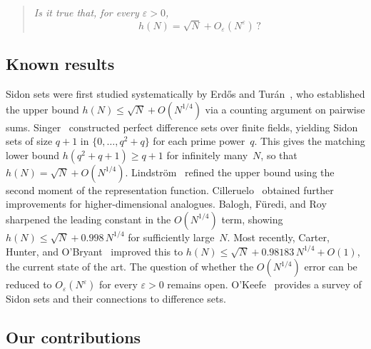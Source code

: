 \documentclass[11pt]{amsart}
\theoremstyle{plain}
\theoremstyle{definition}
\theoremstyle{remark}
\begin{document}
\begin{quote}
\textit{Is it true that, for every $\varepsilon > 0$,}
\[
  h(N) = \sqrt{N} + O_\varepsilon(N^\varepsilon)\,?
\]
\end{quote}

\subsection{Known results}

Sidon sets were first studied systematically by Erd\H{o}s and
Tur\'an~\cite{erdos_turan_1941}, who established the upper bound
$h(N) \le \sqrt{N} + O(N^{1/4})$ via a counting argument on pairwise
sums.
Singer~\cite{singer_1938} constructed perfect difference sets over
finite fields, yielding Sidon sets of size $q+1$ in
$\{0,\dots,q^2+q\}$ for each prime power~$q$.
This gives the matching lower bound $h(q^2+q+1) \ge q+1$ for
infinitely many~$N$, so that
$h(N) = \sqrt{N} + O(N^{1/4})$.
Lindstr\"om~\cite{lindstrom_1969} refined the upper bound using the
second moment of the representation function.
Cilleruelo~\cite{cilleruelo_2010} obtained further improvements for
higher-dimensional analogues.
Balogh, F\"uredi, and Roy~\cite{bfr_2021} sharpened the leading constant
in the $O(N^{1/4})$ term, showing $h(N) \le \sqrt{N} + 0.998\,N^{1/4}$
for sufficiently large~$N$.
Most recently, Carter, Hunter, and O'Bryant~\cite{cho_2025} improved
this to $h(N) \le \sqrt{N} + 0.98183\,N^{1/4} + O(1)$, the current
state of the art.
The question of whether the $O(N^{1/4})$ error can be reduced to
$O_\varepsilon(N^\varepsilon)$ for every $\varepsilon > 0$ remains
open.
O'Keefe~\cite{okeefe_1999} provides a survey of Sidon sets and
their connections to difference sets.

\subsection{Our contributions}
\end{document}
